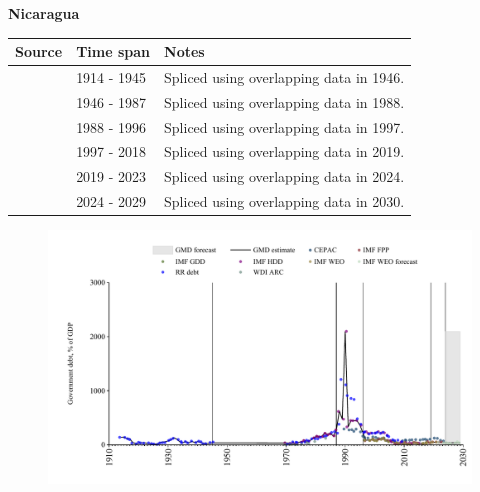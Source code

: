 \documentclass[12pt,a4paper,landscape]{article}
\begin{document}
\begin{adjustbox}{max totalsize={\paperwidth}{\paperheight},center}
\begin{minipage}[t][\textheight][t]{\textwidth}
\vspace*{0.5cm}
{}
\begin{center}
{\Large\bfseries Nicaragua}
\end{center}
\vspace{0.5cm}
\begin{table}[H]
\centering
\small
\begin{tabular}{|l|l|l|}
\hline
\textbf{Source} & \textbf{Time span} & \textbf{Notes} \\
\hline
\rowcolor{white}\cite{RR_debt}& 1914 - 1945 &Spliced using overlapping data in 1946.\\
\rowcolor{lightgray}\cite{IMF_FPP}& 1946 - 1987 &Spliced using overlapping data in 1988.\\
\rowcolor{white}\cite{IMF_HDD}& 1988 - 1996 &Spliced using overlapping data in 1997.\\
\rowcolor{lightgray}\cite{IMF_GDD}& 1997 - 2018 &Spliced using overlapping data in 2019.\\
\rowcolor{white}\cite{IMF_FPP}& 2019 - 2023 &Spliced using overlapping data in 2024.\\
\rowcolor{lightgray}\cite{IMF_WEO_forecast}& 2024 - 2029 &Spliced using overlapping data in 2030.\\
\hline
\end{tabular}
\end{table}
\begin{figure}[H]
\centering
\includegraphics[width=\textwidth,height=0.6\textheight,keepaspectratio]{graphs/NIC_govdebt_GDP.pdf}
\end{figure}
\end{minipage}
\end{adjustbox}
\end{document}
